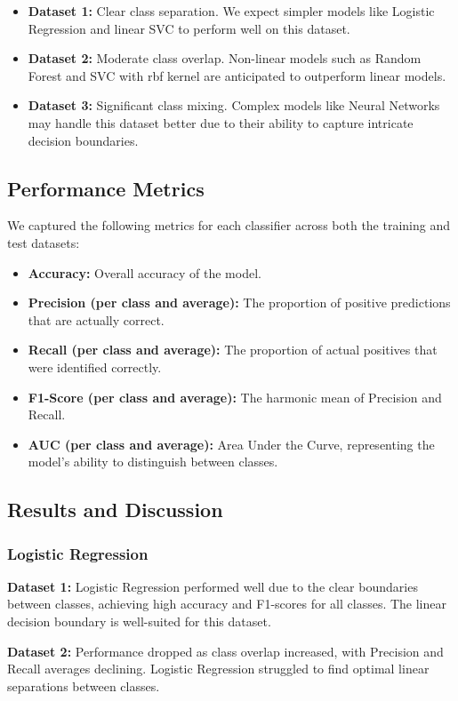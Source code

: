 \begin{itemize}
    \item \textbf{Dataset 1:} Clear class separation. We expect simpler models like Logistic Regression and linear SVC to perform well on this dataset.
    \item \textbf{Dataset 2:} Moderate class overlap. Non-linear models such as Random Forest and SVC with rbf kernel are anticipated to outperform linear models.
    \item \textbf{Dataset 3:} Significant class mixing. Complex models like Neural Networks may handle this dataset better due to their ability to capture intricate decision boundaries.
\end{itemize}

\subsection*{Performance Metrics}
We captured the following metrics for each classifier across both the training and test datasets:
\begin{itemize}
    \item \textbf{Accuracy:} Overall accuracy of the model.
    \item \textbf{Precision (per class and average):} The proportion of positive predictions that are actually correct.
    \item \textbf{Recall (per class and average):} The proportion of actual positives that were identified correctly.
    \item \textbf{F1-Score (per class and average):} The harmonic mean of Precision and Recall.
    \item \textbf{AUC (per class and average):} Area Under the Curve, representing the model's ability to distinguish between classes.
\end{itemize}

\subsection*{Results and Discussion}
\subsubsection*{Logistic Regression}
\textbf{Dataset 1:} Logistic Regression performed well due to the clear boundaries between classes, achieving high accuracy and F1-scores for all classes. The linear decision boundary is well-suited for this dataset.

\textbf{Dataset 2:} Performance dropped as class overlap increased, with Precision and Recall averages declining. Logistic Regression struggled to find optimal linear separations between classes.

